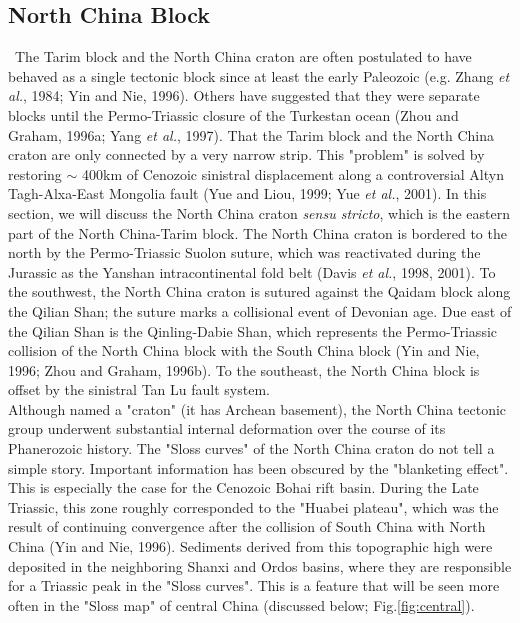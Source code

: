 \documentclass{article}
\begin{document}
 \subsection*{North China Block} \label{sec:ncb}
 ~\indent  The  Tarim  block  and  the North  China  craton  are  often
 postulated to have behaved as  a single tectonic block since at least
 the  early Paleozoic (e.g.   Zhang {\it  et al.},  1984; Yin  and Nie,
 1996).  Others  have suggested that  they were separate  blocks until
 the Permo-Triassic  closure of the Turkestan ocean  (Zhou and Graham,
 1996a; Yang {\it  et al.}, 1997).  That the Tarim  block and the North
 China  craton  are only  connected  by  a  very narrow  strip.   This
 "problem" is  solved by restoring $\sim$ 400km  of Cenozoic sinistral
 displacement  along  a  controversial Altyn  Tagh-Alxa-East  Mongolia
 fault (Yue and Liou, 1999; Yue  {\it et al.}, 2001).  In this section,
 we will discuss the North  China craton {\it sensu stricto}, which is
 the eastern  part of  the North China-Tarim  block.  The  North China
 craton is bordered to the  north by the Permo-Triassic Suolon suture,
 which   was  reactivated   during   the  Jurassic   as  the   Yanshan
 intracontinental fold belt  (Davis {\it et al.}, 1998,  2001).  To the
 southwest, the North China craton is sutured against the Qaidam block
 along  the Qilian  Shan;  the  suture marks  a  collisional event  of
 Devonian age.  Due east of the Qilian Shan is the Qinling-Dabie Shan,
 which  represents the  Permo-Triassic  collision of  the North  China
 block with the South China block (Yin and Nie, 1996; Zhou and Graham,
 1996b).  To  the southeast,  the North China  block is offset  by the
 sinistral Tan Lu fault system.\\

 Although named a "craton" (it  has Archean basement), the North China
 tectonic  group underwent substantial  internal deformation  over the
 course of its  Phanerozoic history.  The "Sloss curves"  of the North
 China craton do  not tell a simple story.   Important information has
 been obscured by the "blanketing effect". This is especially the case
 for the  Cenozoic Bohai rift  basin.  During the Late  Triassic, this
 zone  roughly corresponded  to the  "Huabei plateau",  which  was the
 result of  continuing convergence after the collision  of South China
 with North  China (Yin and  Nie, 1996).  Sediments derived  from this
 topographic high  were deposited in the neighboring  Shanxi and Ordos
 basins, where they are responsible  for a Triassic peak in the "Sloss
 curves". This is a feature that will be seen more often in the "Sloss
 map" of central China (discussed below; Fig.\ref{fig:central}).
\end{document}
